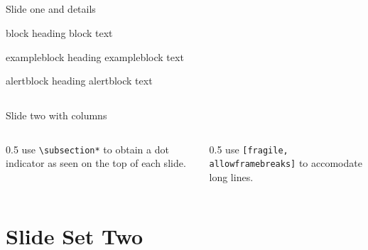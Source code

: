 \documentclass{article}
\begin{document}
\subsection*{}
\begin{frame}[fragile]{\vspace{-20pt}Slide one and details}\vspace{-20pt}


  \begin{block}{block heading}
    block text
  \end{block}
  \begin{exampleblock}{exampleblock heading}
    exampleblock text
  \end{exampleblock}
  \begin{alertblock}{alertblock heading}
    alertblock text
  \end{alertblock}
\end{frame}

\subsection*{}
\begin{frame}{\vspace{-15pt}Slide two with columns}\vspace{-20pt}\parskip=8pt
  \begin{columns}
    \begin{column}{0.5\textwidth}
      use \texttt{\textbackslash subsection*{}} to obtain a dot indicator as seen on the top of each slide.
    \end{column}
    \begin{column}{0.5\textwidth}
      use \texttt{[fragile, allowframebreaks]} to accomodate long lines.
   \end{column}
  \end{columns}
\end{frame}

\section{Slide Set Two}
\begin{frame}{\vspace{-10pt}\insertsectionhead}
  \begin{center}
    \Huge \insertsectionhead
  \end{center}
\end{frame}
\end{document}
